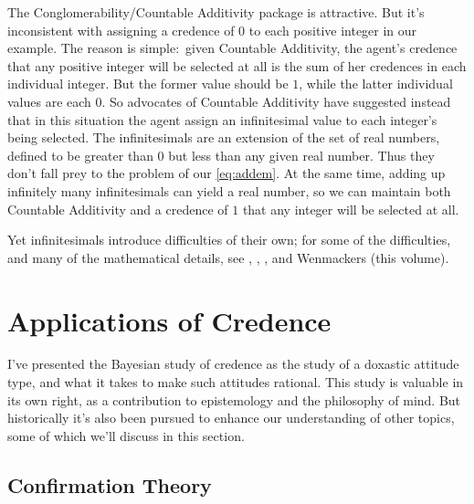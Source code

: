 The Conglomerability/Countable Additivity package is attractive. But it's inconsistent with assigning a credence of $0$ to each positive integer in our example. The reason is simple:\ given Countable Additivity, the agent's credence that any positive integer will be selected at all is the sum of her credences in each individual integer. But the former value should be $1$, while the latter individual values are each $0$. So advocates of Countable Additivity have suggested instead that in this situation the agent assign an infinitesimal value to each integer's being selected. The infinitesimals are an extension of the set of real numbers, defined to be greater than $0$ but less than any given real number. Thus they don't fall prey to the problem of our \autoref{eq:addem}. At the same time, adding up infinitely many infinitesimals can yield a real number, so we can maintain both Countable Additivity and a credence of $1$ that any integer will be selected at all.

Yet infinitesimals introduce difficulties of their own; for some of the difficulties, and many of the mathematical details, see \citet{WilliamsonInfinite}, \citet{EaswaranHyper}, \citet[Section 5]{HajekConditional}, and Wenmackers (this volume).



\section{Applications of Credence}

I've presented the Bayesian study of credence as the study of a doxastic attitude type, and what it takes to make such attitudes rational.  This study is valuable in its own right, as a contribution to epistemology and the philosophy of mind. But historically it's also been pursued to enhance our understanding of other topics, some of which we'll discuss in this section. 

\subsection{Confirmation Theory} \label{ss:confirmation}

